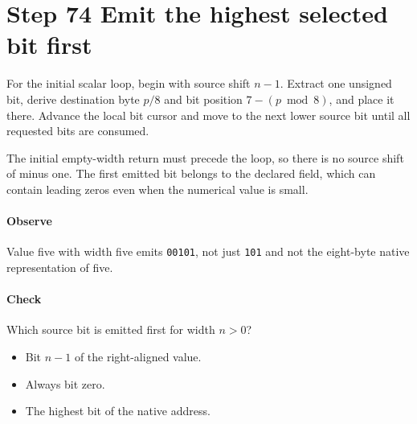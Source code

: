 \section{Step 74 Emit the highest selected bit first}\label{h263-writer-s04}
For the initial scalar loop, begin with source shift $n-1$. Extract one unsigned
bit, derive destination byte $p/8$ and bit position $7-(p\bmod8)$, and place it
there. Advance the local bit cursor and move to the next lower source bit until
all requested bits are consumed.

The initial empty-width return must precede the loop, so there is no source
shift of minus one. The first emitted bit belongs to the declared field, which
can contain leading zeros even when the numerical value is small.

\paragraph{Observe} Value five with width five emits \texttt{00101}, not just
\texttt{101} and not the eight-byte native representation of five.
\paragraph{Check} Which source bit is emitted first for width $n>0$?
\begin{itemize}
  \item[A.] Bit $n-1$ of the right-aligned value.
  \item[B.] Always bit zero.
  \item[C.] The highest bit of the native address.
\end{itemize}
